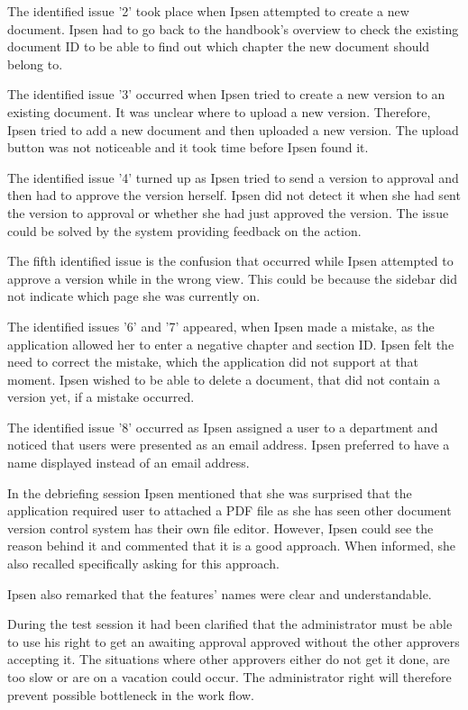 \documentclass[../../master.tex]{subfiles}
\begin{document}
The identified issue '2' took place when Ipsen attempted to create a new document.
Ipsen had to go back to the handbook's overview to check the existing document ID to be able to find out which chapter the new document should belong to.

The identified issue '3' occurred when Ipsen tried to create a new version to an existing document.
It was unclear where to upload a new version.
Therefore, Ipsen tried to add a new document and then uploaded a new version.
The upload button was not noticeable and it took time before Ipsen found it.

The identified issue '4' turned up as Ipsen tried to send a version to approval and then had to approve the version herself.
Ipsen did not detect it when she had sent the version to approval or whether she had just approved the version.
The issue could be solved by the system providing feedback on the action.

The fifth identified issue is the confusion that occurred while Ipsen attempted to approve a version while in the wrong view.
This could be because the sidebar did not indicate which page she was currently on.

The identified issues '6' and '7' appeared, when Ipsen made a mistake, as the application allowed her to enter a negative chapter and section ID.
Ipsen felt the need to correct the mistake, which the application did not support at that moment.
Ipsen wished to be able to delete a document, that did not contain a version yet, if a mistake occurred.

The identified issue '8' occurred as Ipsen assigned a user to a department and noticed that users were presented as an email address.
Ipsen preferred to have a name displayed instead of an email address.

In the debriefing session Ipsen mentioned that she was surprised that the application required user to attached a PDF file as she has seen other document version control system has their own file editor.
However, Ipsen could see the reason behind it and commented that it is a good approach.
When informed, she also recalled specifically asking for this approach.

Ipsen also remarked that the features' names were clear and understandable.

During the test session it had been clarified that the administrator must be able to use his right to get an awaiting approval approved without the other approvers accepting it.
The situations where other approvers either do not get it done, are too slow or are on a vacation could occur.
The administrator right will therefore prevent possible bottleneck in the work flow.
\end{document}
